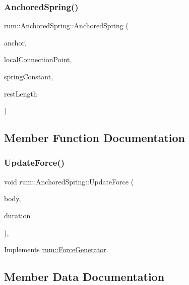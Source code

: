 \subsubsection{\texorpdfstring{Anchored\+Spring()}{AnchoredSpring()}}
{\footnotesize\ttfamily rum\+::\+Anchored\+Spring\+::\+Anchored\+Spring (\begin{DoxyParamCaption}\item[{const glm\+::vec3 \&}]{anchor,  }\item[{const glm\+::vec3 \&}]{local\+Connection\+Point,  }\item[{\hyperlink{namespacerum_a7e8cca23573d5eaead0f138cbaa4862c}{real}}]{spring\+Constant,  }\item[{\hyperlink{namespacerum_a7e8cca23573d5eaead0f138cbaa4862c}{real}}]{rest\+Length }\end{DoxyParamCaption})}



\subsection{Member Function Documentation}
\mbox{\label{classrum_1_1_anchored_spring_a7fd4b23ad409fbb678ecace8e99fed68}} 
\subsubsection{\texorpdfstring{Update\+Force()}{UpdateForce()}}
{\footnotesize\ttfamily void rum\+::\+Anchored\+Spring\+::\+Update\+Force (\begin{DoxyParamCaption}\item[{\hyperlink{classrum_1_1_rigid_body}{Rigid\+Body} $\ast$}]{body,  }\item[{\hyperlink{namespacerum_a7e8cca23573d5eaead0f138cbaa4862c}{real}}]{duration }\end{DoxyParamCaption})\hspace{0.3cm}{\ttfamily [override]}, {\ttfamily [virtual]}}



Implements \hyperlink{classrum_1_1_force_generator_a6b038c9a39e4cf64b2dcf2741804a824}{rum\+::\+Force\+Generator}.



\subsection{Member Data Documentation}
\mbox{\label{classrum_1_1_anchored_spring_ae13ff4ceb813a9e88182fdf04d890d08}} 
